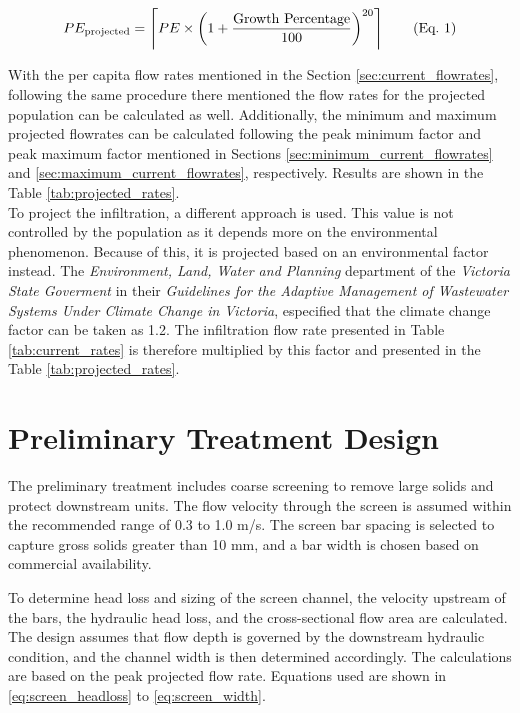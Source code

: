 \documentclass[12pt]{article}
\begin{document}
\begin{align}
  \refstepcounter{equation}
  PE_{\text{projected}} = \left\lceil PE \times \left(1 + \frac{\text{Growth Percentage}}{100} \right)^{20} \right\rceil 
  \tag{Eq.~\theequation} \label{eq:population_projection}
\end{align}

With the per capita flow rates mentioned in the Section \ref{sec:current_flowrates}, following the same procedure there mentioned
the flow rates for the projected population can be calculated as well. Additionally, the minimum and maximum projected flowrates
can be calculated following the peak minimum factor and peak maximum factor mentioned in Sections \ref{sec:minimum_current_flowrates}
and \ref{sec:maximum_current_flowrates}, respectively. Results are shown in the Table \ref{tab:projected_rates}.\\

To project the infiltration, a different approach is used. This value is not controlled by
the population as it depends more on the environmental phenomenon. Because of this, it is projected
based on an environmental factor instead. The \textit{Environment, Land, Water and Planning} department
of the \textit{Victoria State Goverment} in their \textit{Guidelines for the Adaptive Management of 
Wastewater Systems Under Climate Change in Victoria}, especified that the climate change factor
can be taken as 1.2. The infiltration flow rate presented in Table \ref{tab:current_rates} is therefore multiplied by this
factor and presented in the Table \ref{tab:projected_rates}.





\newpage

\section{Preliminary Treatment Design}
\label{sec:prelim_treatment}

The preliminary treatment includes coarse screening to remove large solids and protect downstream units.
The flow velocity through the screen is assumed within the recommended range of 0.3 to 1.0 m/s.
The screen bar spacing is selected to capture gross solids greater than 10 mm, and a bar width is
chosen based on commercial availability.

To determine head loss and sizing of the screen channel, the velocity upstream of the bars, 
the hydraulic head loss, and the cross-sectional flow area are calculated. The design assumes 
that flow depth is governed by the downstream hydraulic condition, and the channel width is then determined accordingly. 
The calculations are based on the peak projected flow rate. Equations used are shown in \eqref{eq:screen_headloss} to 
\eqref{eq:screen_width}.
\end{document}
